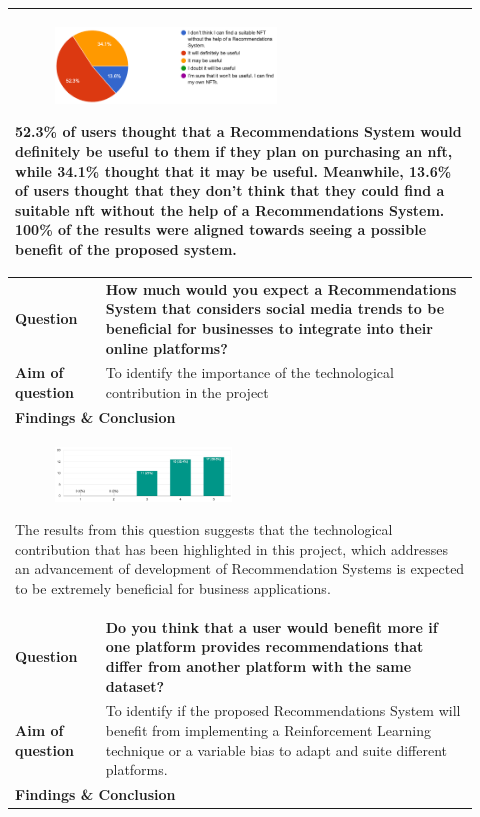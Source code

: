 \begin{longtable}{|p{0.18\linewidth}|p{0.74\linewidth}|}
\multicolumn{2}{|l|}{
\parbox{\textwidth}{
\begin{figure}
\includegraphics[width=0.6\textwidth]{images/SRS/survey/survey-4.png}
\end{figure}

52.3\% of users thought that a Recommendations System would definitely be useful to them if they plan on purchasing an \gls{nft}, while 34.1\% thought that it may be useful. Meanwhile, 13.6\% of users thought that they don't think that they could find a suitable \gls{nft} without the help of a Recommendations System. 100\% of the results were aligned towards seeing a possible benefit of the proposed system.
}
}
\\
\hline
\textbf{Question} & \textbf{How much would you expect a Recommendations System that considers social media trends to be beneficial for businesses to integrate into their online platforms?} \\
\hline
\textbf{Aim of question} & To identify the importance of the technological contribution in the project \\
\hline
\multicolumn{2}{|l|}{\textbf{Findings \& Conclusion}} \\

\multicolumn{2}{|l|}{
\parbox{\textwidth}{
\begin{figure}
\includegraphics[width=0.48\textwidth]{images/SRS/survey/survey-5.png}
\end{figure}

The results from this question suggests that the technological contribution that has been highlighted in this project, which addresses an advancement of development of Recommendation Systems is expected to be extremely beneficial for business applications.
}
}
\\
\hline
\textbf{Question} & \textbf{Do you think that a user would benefit more if one platform provides recommendations that differ from another platform with the same dataset?} \\
\hline
\textbf{Aim of question} & To identify if the proposed Recommendations System will benefit from implementing a Reinforcement Learning technique or a variable bias to adapt and suite different platforms. \\
\hline
\multicolumn{2}{|l|}{\textbf{Findings \& Conclusion}} \\


\end{longtable}
